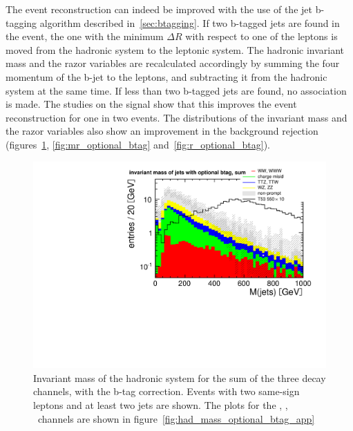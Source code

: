 The event reconstruction can indeed be improved with the use of the jet
b-tagging algorithm described in~\ref{sec:btagging}. If two b-tagged jets
are found in the event, the one with the minimum $\Delta R$ with respect to
one of the leptons is moved from the hadronic system to the leptonic system.
The hadronic invariant mass and the razor variables are recalculated
accordingly by summing the four momentum of the b-jet to the leptons, and
subtracting it from the hadronic system at the same time.
If less than two b-tagged jets are found, no association is made.
The studies on the signal show that this improves the event reconstruction
for one in two events. The distributions of the invariant mass and the razor
variables also show an improvement in the background rejection
(figures~\ref{fig:had_mass_optional_btag}, \ref{fig:mr_optional_btag}
and~\ref{fig:r_optional_btag}).

\begin{figure}[htb]
    \centering
    \includegraphics[width=\textwidth]{images/pdf/had_mass_optional_btag_sum_0}
    \caption{Invariant mass of the hadronic system for the sum of the three decay channels, with the b-tag correction. Events with two same-sign leptons and at least
two jets are shown. The plots for the \E\E, \E\M, \M\M\ channels are
shown in figure~\ref{fig:had_mass_optional_btag_app}}
    \label{fig:had_mass_optional_btag}
\end{figure}

